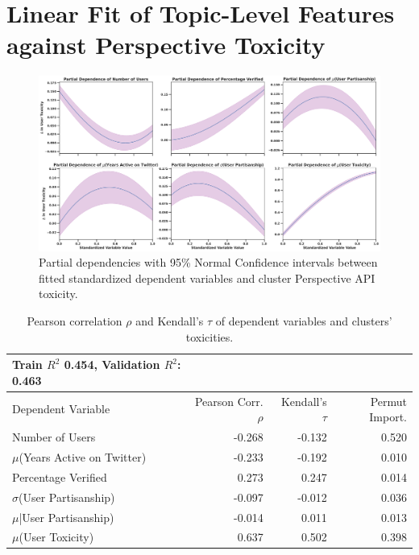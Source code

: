 \section{Linear Fit of Topic-Level Features against Perspective Toxicity \label{sec:cluster-perspective-tox}}
\begin{figure}[!h]
\begin{minipage}[l]{1.0\textwidth}
\includegraphics[width=1\columnwidth]{figures/partial_dependence_important_variables-clusterlevel-perspective.pdf} 
\end{minipage}
\begin{minipage}[l]{1\textwidth}
\caption{Partial dependencies with 95\% Normal Confidence intervals between fitted standardized dependent variables and cluster Perspective API toxicity.}
\end{minipage}
\end{figure}
\begin{table}[!h]
    \small
    \centering
    \begin{tabularx}{0.85\columnwidth}{l|rrr}
      Train $R^2$ 0.454, Validation $R^2$:  0.463  \\
    \toprule
      Dependent Variable  & Pearson Corr. $\rho$ & Kendall's $\tau$ & Permut Import. \\    \midrule
  Number of Users &-0.268 & -0.132  & 0.520  \\
 $\mu$(Years Active on Twitter) &-0.233 & -0.192 & 0.010\\
  Percentage Verified &0.273 & 0.247 & 0.014 \\
$\sigma$(User Partisanship) & -0.097 & -0.012 & 0.036 \\
  $\mu$|User Partisanship) & -0.014 &  0.011 & 0.013 \\
  $\mu$(User Toxicity) &  0.637 & 0.502 & 0.398 \\
    \bottomrule
    \end{tabularx}
  \caption{Pearson correlation $\rho$ and Kendall's $\tau$ of dependent variables and clusters' toxicities. } 
   \vspace{-15pt}
   \label{table:regression-20240402}
\end{table}
